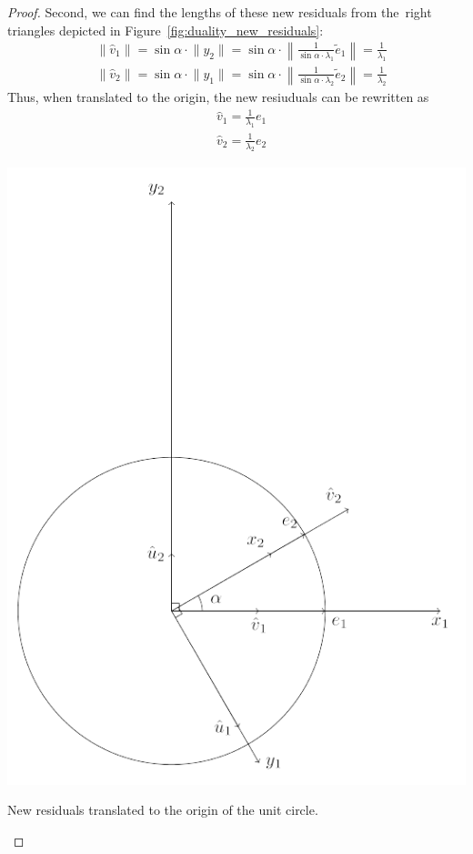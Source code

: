 \begin{proof}
Second, we can find the lengths of these new residuals from the~right
triangles depicted in Figure~\ref{fig:duality_new_residuals}:
\begin{align*}
& \lVert \hat{v}_1 \rVert = \sin \alpha \cdot \lVert y_2 \rVert = \sin \alpha \cdot \left\lVert \frac{1}{\sin \alpha \cdot \lambda_1} \tilde{e}_1 \right\rVert = \frac{1}{\lambda_1} \\
& \lVert \hat{v}_2 \rVert = \sin \alpha \cdot \lVert y_1 \rVert = \sin \alpha \cdot \left\lVert \frac{1}{\sin \alpha \cdot \lambda_2} \tilde{e}_2 \right\rVert = \frac{1}{\lambda_2}
\end{align*}
Thus, when translated to the origin, the new resiuduals can be rewritten as
\begin{align*}
& \hat{v}_1 = \frac{1}{\lambda_1} e_1 \\
& \hat{v}_2 = \frac{1}{\lambda_2} e_2
\end{align*}

\begin{marginfigure}[4\baselineskip]
\includegraphics[scale=0.6]{figures/02_duality_final.pdf}
\label{fig:duality_final}
\caption{New residuals translated to the origin of the unit circle.}
\end{marginfigure}


\end{proof}
